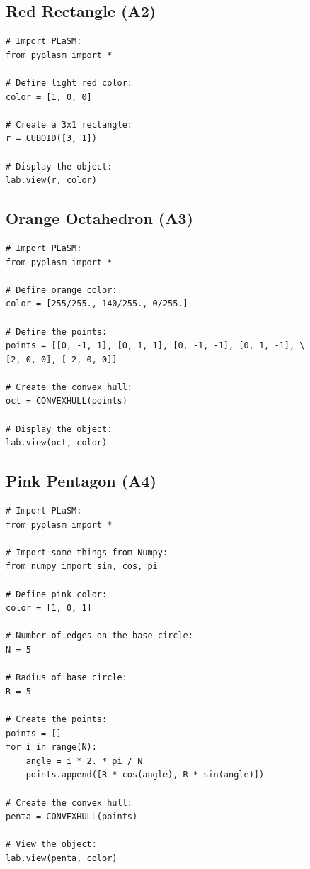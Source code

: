 \documentclass[article,A4,12pt]{llncs}
\begin{document}
\subsection{Red Rectangle (A2)}

\begin{verbatim}
# Import PLaSM:
from pyplasm import *

# Define light red color:
color = [1, 0, 0]

# Create a 3x1 rectangle:
r = CUBOID([3, 1])

# Display the object:
lab.view(r, color)
\end{verbatim}


\subsection{Orange Octahedron (A3)}

\begin{verbatim}
# Import PLaSM:
from pyplasm import *

# Define orange color:
color = [255/255., 140/255., 0/255.]

# Define the points:
points = [[0, -1, 1], [0, 1, 1], [0, -1, -1], [0, 1, -1], \
[2, 0, 0], [-2, 0, 0]]

# Create the convex hull:
oct = CONVEXHULL(points)

# Display the object:
lab.view(oct, color)
\end{verbatim}


\subsection{Pink Pentagon (A4)}

\begin{verbatim}
# Import PLaSM:
from pyplasm import *

# Import some things from Numpy:
from numpy import sin, cos, pi

# Define pink color:
color = [1, 0, 1]

# Number of edges on the base circle:
N = 5

# Radius of base circle:
R = 5

# Create the points:
points = []
for i in range(N):
    angle = i * 2. * pi / N
    points.append([R * cos(angle), R * sin(angle)])
    
# Create the convex hull:
penta = CONVEXHULL(points)

# View the object:
lab.view(penta, color)
\end{verbatim}
\end{document}
